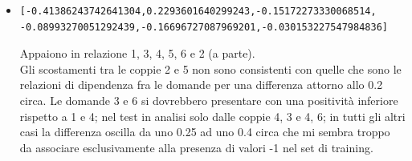 \begin{itemize}
\item \begin{verbatim}[-0.41386243742641304,0.2293601640299243,-0.15172273330068514,
-0.08993270051292439,-0.16696727087969201,-0.030153227547984836]\end{verbatim}
Appaiono in relazione 1, 3, 4, 5, 6 e 2 (a parte).\\
Gli scostamenti tra le coppie 2 e 5 non sono consistenti con quelle che sono le relazioni di dipendenza fra le domande per una differenza attorno allo 0.2 circa.
Le domande 3 e 6 si dovrebbero presentare con una positivit\`a inferiore rispetto a 1 e 4; nel test in analisi solo dalle coppie 4, 3 e 4, 6; in tutti gli altri casi la differenza oscilla da uno 0.25 ad uno 0.4 circa che mi sembra troppo da associare esclusivamente alla presenza di valori -1 nel set di training.
\end{itemize}


